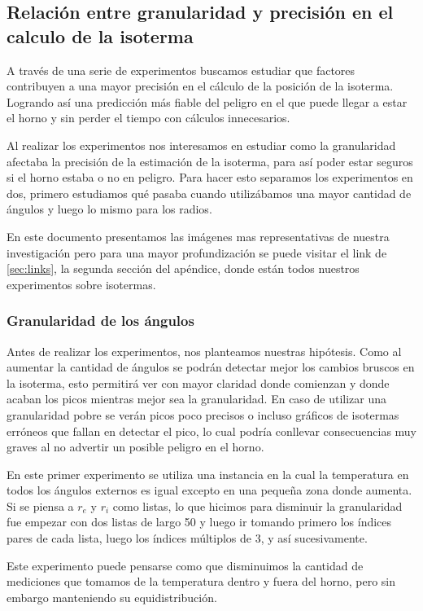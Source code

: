 \subsection{Relación entre granularidad y precisión en el calculo de la isoterma}
A través de una serie de experimentos buscamos estudiar que factores contribuyen a una mayor precisión en el cálculo de la posición de la isoterma. Logrando así una predicción más fiable del peligro en el que puede llegar a estar el horno y sin perder el tiempo con cálculos innecesarios.

Al realizar los experimentos nos interesamos en estudiar como la granularidad afectaba la precisión de la estimación de la isoterma, para así poder estar seguros si el horno estaba o no en peligro. Para hacer esto separamos los experimentos en dos, primero estudiamos qué pasaba cuando utilizábamos una mayor cantidad de ángulos y luego lo mismo para los radios.

En este documento presentamos las imágenes mas representativas de nuestra investigación pero para una mayor profundización se puede visitar el link de \ref{sec:links}, la segunda sección del apéndice, donde están todos nuestros experimentos sobre isotermas.


\subsubsection{Granularidad de los ángulos}

Antes de realizar los experimentos, nos planteamos nuestras hipótesis. Como al aumentar la cantidad de ángulos se podrán detectar mejor los cambios bruscos en la isoterma, esto permitirá ver con mayor claridad donde comienzan y donde acaban los picos mientras mejor sea la granularidad. En caso de utilizar una granularidad pobre se verán picos poco precisos o incluso gráficos de isotermas erróneos que fallan en detectar el pico, lo cual podría conllevar consecuencias muy graves al no advertir un posible peligro en el horno.

En este primer experimento se utiliza una instancia en la cual la temperatura en todos los ángulos externos es igual excepto en una pequeña zona donde aumenta. 
Si se piensa a $r_e$ y $r_i$ como listas, lo que hicimos para disminuir la granularidad fue empezar con dos listas de largo 50 y luego ir tomando primero los índices pares de cada lista, luego los índices múltiplos de 3, y así sucesivamente.

Este experimento puede pensarse como que disminuimos la cantidad de mediciones que tomamos de la temperatura dentro y fuera del horno, pero sin embargo manteniendo su equidistribución.


